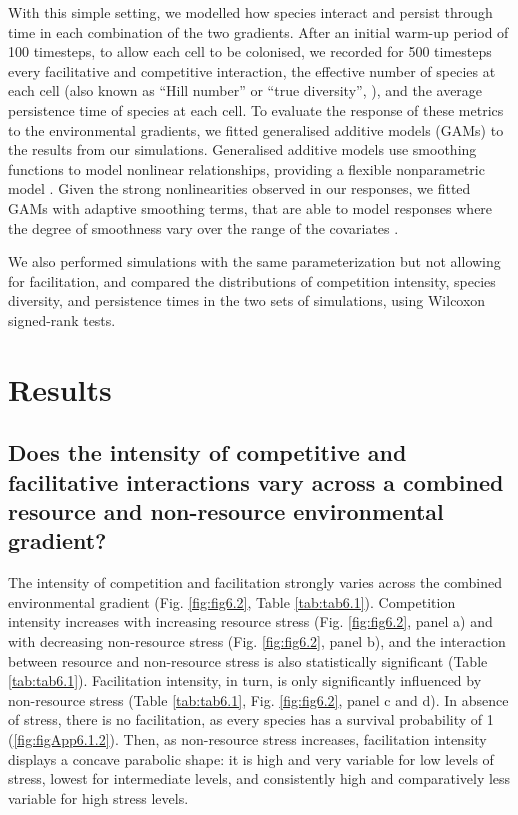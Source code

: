With this simple setting, we modelled how species interact and persist through time in each combination of the two gradients. After an initial warm-up period of 100 timesteps, to allow each cell to be colonised, we recorded for 500 timesteps every facilitative and competitive interaction, the effective number of species at each cell (also known as “Hill number” or “true diversity”, \citealt{Tuomisto2012}), and the average persistence time of species at each cell. To evaluate the response of these metrics to the environmental gradients, we fitted generalised additive models (GAMs) to the results from our simulations. Generalised additive models use smoothing functions to model nonlinear relationships, providing a flexible nonparametric model \citep{Wood2017}. Given the strong nonlinearities observed in our responses, we fitted GAMs with adaptive smoothing terms, that are able to model responses where the degree of smoothness vary over the range of the covariates \citep{Wood2017}.

We also performed simulations with the same parameterization but not allowing for facilitation, and compared the distributions of competition intensity, species diversity, and persistence times in the two sets of simulations, using Wilcoxon signed-rank tests.

\section{Results}

\subsection*{Does the intensity of competitive and facilitative interactions vary across a combined resource and non-resource environmental gradient?}

The intensity of competition and facilitation strongly varies across the combined environmental gradient (Fig. \ref{fig:fig6.2}, Table \ref{tab:tab6.1}). Competition intensity increases with increasing resource stress (Fig. \ref{fig:fig6.2}, panel a) and with decreasing non-resource stress (Fig. \ref{fig:fig6.2}, panel b), and the interaction between resource and non-resource stress is also statistically significant (Table \ref{tab:tab6.1}). Facilitation intensity, in turn, is only significantly influenced by non-resource stress (Table \ref{tab:tab6.1}, Fig. \ref{fig:fig6.2}, panel c and d). In absence of stress, there is no facilitation, as every species has a survival probability of 1 (\cref{fig:figApp6.1.2}). Then, as non-resource stress increases, facilitation intensity displays a concave parabolic shape: it is high and very variable for low levels of stress, lowest for intermediate levels, and consistently high and comparatively less variable for high stress levels.

